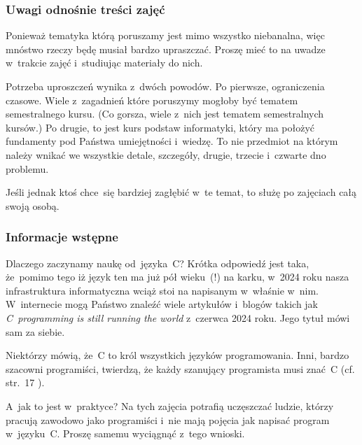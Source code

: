 \documentclass[10pt,t]{beamer}
\begin{document}
\begin{frame}
  \frametitle{Uwagi odnośnie treści zajęć}


  Ponieważ tematyka którą poruszamy jest mimo wszystko niebanalna, więc
  mnóstwo rzeczy będę musiał bardzo \alert{upraszczać}. Proszę mieć to na
  uwadze w~trakcie zajęć i~studiując materiały do nich.

  Potrzeba uproszczeń wynika z~dwóch powodów. Po pierwsze, ograniczenia
  czasowe. Wiele z~zagadnień które poruszymy mogłoby być tematem
  semestralnego kursu. (Co gorsza, wiele z~nich \alert{jest} tematem
  semestralnych kursów.) Po drugie, to jest kurs \alert{podstaw}
  informatyki, który ma położyć fundamenty pod Państwa umiejętności
  i~wiedzę. To nie przedmiot na którym należy wnikać we wszystkie detale,
  szczegóły, drugie, trzecie i~czwarte dno problemu.

  Jeśli jednak ktoś chce~się bardziej zagłębić w~te temat, to służę po
  zajęciach całą swoją osobą.

\end{frame}





\begin{frame}
  \frametitle{Informacje wstępne}


  Dlaczego zaczynamy naukę od~języka~C? Krótka odpowiedź jest taka,
  że~pomimo tego iż język ten ma już pół wieku~(!) na karku, w~2024 roku
  nasza infrastruktura informatyczna wciąż stoi na napisanym w~właśnie
  w~nim. W~internecie mogą Państwo znaleźć wiele artykułów i~blogów takich
  jak
  {\textit{C~programming is still running the world}}
  \parencite{Scott-C-programming-is-still-ETC-Ver-2024} z~czerwca 2024 roku.
  Jego tytuł mówi sam za siebie.

  Niektórzy mówią, że~C to król wszystkich języków programowania.
  Inni, bardzo szacowni programiści, twierdzą, że każdy szanujący
  programista musi znać~C (cf. str.~17
  \parencite{Hoey-Programowanie-w-asemblerze-x64-ETC-Pub-2024}).

  A~jak to jest w~praktyce? Na tych zajęcia potrafią uczęszczać ludzie,
  którzy pracują zawodowo jako programiści i~nie mają pojęcia jak napisać
  program w~języku~C. Proszę samemu wyciągnąć z~tego wnioski.

\end{frame}
\end{document}
